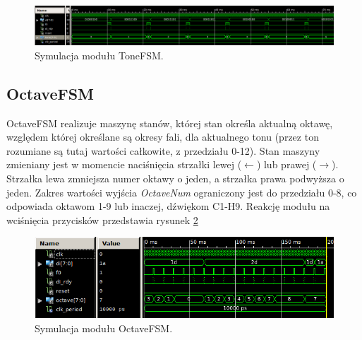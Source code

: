 \documentclass[12pt]{article}
\begin{document}
\begin{figure}[H]
  \centering
  \includegraphics[decodearray={1 0 1 0 1 0}, width=\linewidth]{images/tone}
  \caption{Symulacja modułu ToneFSM.}
  \label{sim:tone}
\end{figure}

\clearpage

\subsection{OctaveFSM}

OctaveFSM realizuje maszynę stanów, której stan określa aktualną oktawę, względem której określane są okresy fali, dla aktualnego tonu (przez ton rozumiane są tutaj wartości całkowite, z przedziału 0-12). Stan maszyny zmieniany jest w momencie naciśnięcia strzałki lewej ($\leftarrow$) lub prawej ($\rightarrow$). Strzałka lewa zmniejsza numer oktawy o jeden, a strzałka prawa podwyższa o jeden. Zakres wartości wyjścia \textit{OctaveNum} ograniczony jest do przedziału 0-8, co odpowiada oktawom 1-9 lub inaczej, dźwiękom C1-H9. Reakcję modułu na wciśnięcia przycisków przedstawia rysunek \ref{sim:octavefsm}

\begin{figure}[H]
    \centering
    \includegraphics[decodearray={1 0 1 0 1 0}, width=\linewidth]{images/octavefsm.png} %
    \caption{Symulacja modułu OctaveFSM.}
    \label{sim:octavefsm}
\end{figure}

\clearpage
\end{document}
